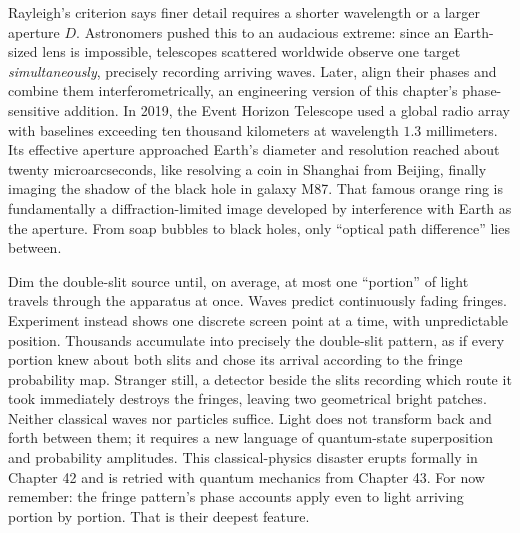 
\begin{thought}
Rayleigh's criterion says finer detail requires a shorter wavelength or a larger aperture \(D\). Astronomers pushed this to an audacious extreme: since an Earth-sized lens is impossible, telescopes scattered worldwide observe one target \emph{simultaneously}, precisely recording arriving waves. Later, align their phases and combine them interferometrically, an engineering version of this chapter's phase-sensitive addition. In 2019, the Event Horizon Telescope used a global radio array with baselines exceeding ten thousand kilometers at wavelength \(1.3\) millimeters. Its effective aperture approached Earth's diameter and resolution reached about twenty microarcseconds, like resolving a coin in Shanghai from Beijing, finally imaging the shadow of the black hole in galaxy M87. That famous orange ring is fundamentally a diffraction-limited image developed by interference with Earth as the aperture. From soap bubbles to black holes, only ``optical path difference'' lies between.
\end{thought}

\begin{thought}
Dim the double-slit source until, on average, at most one ``portion'' of light travels through the apparatus at once. Waves predict continuously fading fringes. Experiment instead shows one discrete screen point at a time, with unpredictable position. Thousands accumulate into precisely the double-slit pattern, as if every portion knew about both slits and chose its arrival according to the fringe probability map. Stranger still, a detector beside the slits recording which route it took immediately destroys the fringes, leaving two geometrical bright patches. Neither classical waves nor particles suffice. Light does not transform back and forth between them; it requires a new language of quantum-state superposition and probability amplitudes. This classical-physics disaster erupts formally in Chapter 42 and is retried with quantum mechanics from Chapter 43. For now remember: the fringe pattern's phase accounts apply even to light arriving portion by portion. That is their deepest feature.
\end{thought}

